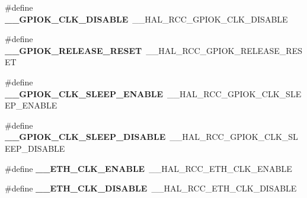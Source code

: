 \begin{DoxyCompactItemize}
\item 
\#define {\bfseries \+\_\+\+\_\+\+G\+P\+I\+O\+K\+\_\+\+C\+L\+K\+\_\+\+D\+I\+S\+A\+B\+LE}~\+\_\+\+\_\+\+H\+A\+L\+\_\+\+R\+C\+C\+\_\+\+G\+P\+I\+O\+K\+\_\+\+C\+L\+K\+\_\+\+D\+I\+S\+A\+B\+LE\hypertarget{group___h_a_l___r_c_c___aliased_ga90f5f4d0c32f259a4cdc27b0321ed877}{}\label{group___h_a_l___r_c_c___aliased_ga90f5f4d0c32f259a4cdc27b0321ed877}

\item 
\#define {\bfseries \+\_\+\+\_\+\+G\+P\+I\+O\+K\+\_\+\+R\+E\+L\+E\+A\+S\+E\+\_\+\+R\+E\+S\+ET}~\+\_\+\+\_\+\+H\+A\+L\+\_\+\+R\+C\+C\+\_\+\+G\+P\+I\+O\+K\+\_\+\+R\+E\+L\+E\+A\+S\+E\+\_\+\+R\+E\+S\+ET\hypertarget{group___h_a_l___r_c_c___aliased_ga3a1d57ca9cb48a1fab12865a28e37c86}{}\label{group___h_a_l___r_c_c___aliased_ga3a1d57ca9cb48a1fab12865a28e37c86}

\item 
\#define {\bfseries \+\_\+\+\_\+\+G\+P\+I\+O\+K\+\_\+\+C\+L\+K\+\_\+\+S\+L\+E\+E\+P\+\_\+\+E\+N\+A\+B\+LE}~\+\_\+\+\_\+\+H\+A\+L\+\_\+\+R\+C\+C\+\_\+\+G\+P\+I\+O\+K\+\_\+\+C\+L\+K\+\_\+\+S\+L\+E\+E\+P\+\_\+\+E\+N\+A\+B\+LE\hypertarget{group___h_a_l___r_c_c___aliased_ga1803ca1023d1e973906ea33217213506}{}\label{group___h_a_l___r_c_c___aliased_ga1803ca1023d1e973906ea33217213506}

\item 
\#define {\bfseries \+\_\+\+\_\+\+G\+P\+I\+O\+K\+\_\+\+C\+L\+K\+\_\+\+S\+L\+E\+E\+P\+\_\+\+D\+I\+S\+A\+B\+LE}~\+\_\+\+\_\+\+H\+A\+L\+\_\+\+R\+C\+C\+\_\+\+G\+P\+I\+O\+K\+\_\+\+C\+L\+K\+\_\+\+S\+L\+E\+E\+P\+\_\+\+D\+I\+S\+A\+B\+LE\hypertarget{group___h_a_l___r_c_c___aliased_gac501e53a279698d854bf9767c7590777}{}\label{group___h_a_l___r_c_c___aliased_gac501e53a279698d854bf9767c7590777}

\item 
\#define {\bfseries \+\_\+\+\_\+\+E\+T\+H\+\_\+\+C\+L\+K\+\_\+\+E\+N\+A\+B\+LE}~\+\_\+\+\_\+\+H\+A\+L\+\_\+\+R\+C\+C\+\_\+\+E\+T\+H\+\_\+\+C\+L\+K\+\_\+\+E\+N\+A\+B\+LE\hypertarget{group___h_a_l___r_c_c___aliased_ga2e62d1334a35dec7840abd947e7c5e08}{}\label{group___h_a_l___r_c_c___aliased_ga2e62d1334a35dec7840abd947e7c5e08}

\item 
\#define {\bfseries \+\_\+\+\_\+\+E\+T\+H\+\_\+\+C\+L\+K\+\_\+\+D\+I\+S\+A\+B\+LE}~\+\_\+\+\_\+\+H\+A\+L\+\_\+\+R\+C\+C\+\_\+\+E\+T\+H\+\_\+\+C\+L\+K\+\_\+\+D\+I\+S\+A\+B\+LE\hypertarget{group___h_a_l___r_c_c___aliased_ga79a0882631a52ff9b86a89822122a41e}{}\label{group___h_a_l___r_c_c___aliased_ga79a0882631a52ff9b86a89822122a41e}


\end{DoxyCompactItemize}
